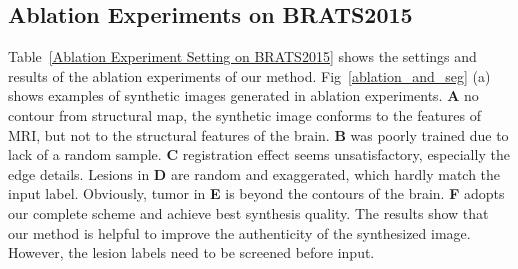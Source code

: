 \documentclass[runningheads]{llncs}
\begin{document}
	\subsection{Ablation Experiments on BRATS2015}
	Table~\ref{Ablation Experiment Setting on BRATS2015} shows the settings and results of the ablation experiments of our method.
	Fig~\ref{ablation_and_seg} (a) shows examples of synthetic images generated in ablation experiments. 
	\textbf{A} no contour from structural map, the synthetic image conforms to the features of MRI, but not to the structural features of the brain. 
	\textbf{B} was poorly trained due to lack of a random sample.
	\textbf{C} registration effect seems unsatisfactory, especially the edge details.
	Lesions in \textbf{D} are random and exaggerated, which hardly match the input label. 
	Obviously, tumor in \textbf{E} is beyond the contours of the brain. 
	\textbf{F} adopts our complete scheme and achieve best synthesis quality. The results show that our method is helpful to improve the authenticity of the synthesized image. However, the lesion labels need to be screened before input.
	
\end{document}
